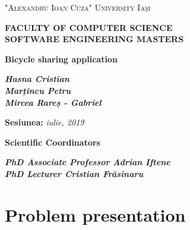 \documentclass[12pt]{article}
\begin{document}
\renewcommand{\baselinestretch}{1}
\setlength{\parskip}{0.5em}

\begin{titlepage}
\begin{center}

{\scshape\Large {"Alexandru Ioan Cuza" University Iaşi}\par}\vspace{0.5cm} 
\textbf{\textsc{\Large {FACULTY OF COMPUTER SCIENCE}}}\\[0.5cm] 
\textbf{\textsc{\Large {SOFTWARE ENGINEERING MASTERS}}}\\[0.5cm] 
\vspace{1cm}
\centering

\vspace{0.6cm}
{\huge \bfseries {Bicycle sharing application}\par}\vspace{0.4cm} 
\vspace{1.5cm}

\begin{center}
\textbf{\textit{\LARGE Hasna Cristian}} \\
\vspace{0.3cm}
\textbf{\textit{\LARGE Marțincu Petru}} \\
\vspace{0.25cm}
\textbf{\textit{\LARGE Mircea Rareș - Gabriel}}
\end{center}

\vspace{0.7cm}
\begin{center}
\textbf{\Large Sesiunea: }{\textit{\LARGE iulie, 2019}}
\end{center}

\vspace{0.7cm}
\begin{center}
\textbf{\Large Scientific Coordinators}\par
\vspace{0.3cm}
\textbf{\textit{PhD Associate Professor Adrian Iftene}} \\
\vspace{0.3cm}
\textbf{\textit{PhD Lecturer Cristian Frăsinaru }}
\end{center}

\end{center}
\end{titlepage}
\let\cleardoublepage\clearpage\newpage

\section{Problem presentation}
\end{document}
